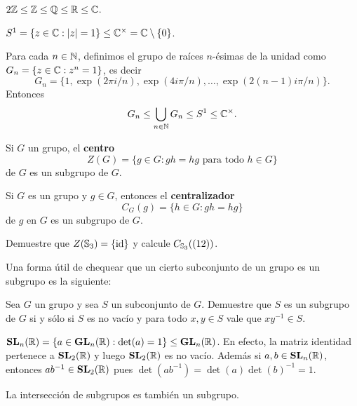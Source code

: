 \begin{example}
$2\mathbb{Z}\leq\mathbb{Z}\leq\mathbb{Q}\leq\mathbb{R}\leq\mathbb{C}$. 	
\end{example}

\begin{example}
$S^1=\{z\in\mathbb{C}:|z|=1\}\leq\mathbb{C}^\times=\mathbb{C}\setminus\{0\}$.
\end{example}

\begin{example}
Para cada $n\in\mathbb{N}$, definimos el grupo de raíces $n$-ésimas de la unidad como $G_n=\{z\in\mathbb{C}:z^n=1\}$, es decir 
\[
G_n=\{1,\exp(2\pi i/n),\exp(4i\pi/n),\dots,\exp(2(n-1)i\pi/n)\}.
\]
Entonces
\[
G_n\leq\bigcup_{n\in\mathbb{N}}G_n\leq S^1\leq\mathbb{C}^\times.
\]
\end{example}

\begin{exercise}
	Si $G$ un grupo, el \textbf{centro} 
	\[
		Z(G)=\{g\in G:gh=hg\text{ para todo	$h\in G$}\}
	\]
	de $G$ es un subgrupo de $G$.
\end{exercise}

\begin{exercise}
	Si $G$ es un grupo y $g\in G$, entonces el \textbf{centralizador} 
	\[
		C_G(g)=\{h\in G:gh=hg\} 
	\]
	de $g$ en $G$ es un subgrupo de $G$.
\end{exercise}

\begin{exercise}
Demuestre que $Z(\mathbb{S}_3)=\{\operatorname{id}\}$ y calcule $C_{\mathbb{S}_3}((12))$. 
\end{exercise}

Una forma útil de chequear que un cierto subconjunto de un grupo 
es un subgrupo es la siguiente:

\begin{exercise}
	Sea $G$ un grupo y sea $S$ un subconjunto de $G$. Demuestre que $S$ es un subgrupo
	de $G$ si y sólo si $S$ es no vacío y para todo $x,y\in S$ vale que $xy^{-1}\in S$. 
\end{exercise}

\begin{example}
$\mathbf{SL}_n(\mathbb{R})=\{a\in\mathbf{GL}_n(\mathbb{R}):\det(a)=1\}\leq\mathbf{GL}_n(\mathbb{R})$. En efecto, la matriz identidad pertenece a $\mathbf{SL}_2(\mathbb{R})$ y luego $\mathbf{SL}_2(\mathbb{R})$ es no vacío. Además si $a,b\in\mathbf{SL}_n(\mathbb{R})$, 
entonces $ab^{-1}\in\mathbf{SL}_2(\mathbb{R})$ pues $\det(ab^{-1})=\det(a)\det(b)^{-1}=1	$. 
\end{example}

\begin{exercise}
	La intersección de subgrupos es también un subgrupo.
\end{exercise}


